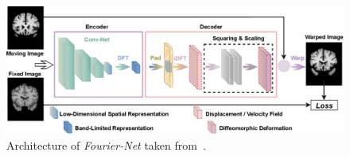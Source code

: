\begin{figure}[h] %
	\centering
	\graphicspath{{images/}{\main/images/}}
	\includegraphics[width=\linewidth]{ArchitectureFourier-Net.png} 
	\caption{Architecture of \emph{Fourier-Net} taken from~\cite{Fourier-Net}.}
	\label{fig:Fourier-Net}
\end{figure}

